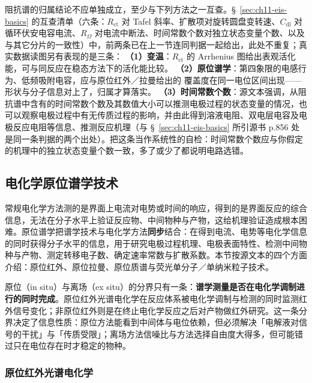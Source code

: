 \begin{crosscheck}
 阻抗谱的归属结论不应单独成立，至少与下列方法之一互查。§~\ref{sec:ch11-eis-basics} 的互查清单（六条：$R_{\mathrm{ct}}$ 对 Tafel 斜率、扩散项对旋转圆盘变转速、$C_{\mathrm{dl}}$ 对循环伏安电容电流、$R_{\Omega}$ 对电流中断法、时间常数个数对独立状态变量个数、以及与其它分片的一致性）中，前两条已在上一节连同判据一起给出，此处不重复；真实数据读图另有表现的是三条：
 \textbf{（1）变温}：$R_{\mathrm{ct}}$ 的 Arrhenius 图给出表观活化能，可与同反应在稳态方法下的活化能比较。
 \textbf{（2）原位谱学}：第四象限的电感行为、低频吸附电容，应与原位红外／拉曼给出的  覆盖度在同一电位区间出现——形状与分子信息对上了，归属才算落实。
 \textbf{（3）时间常数个数}：源文本强调，从阻抗谱中含有的时间常数个数及其数值大小可以推测电极过程的状态变量的情况，也可以观察电极过程中有无传质过程的影响，并由此得到溶液电阻、双电层电容及电极反应电阻等信息、推测反应机理（与 §~\ref{sec:ch11-eis-basics} 所引源书 p.856 处是同一条判据的两个出处）。把这条当作系统性的自检：时间常数个数应与你假定的机理中的独立状态变量个数一致，多了或少了都说明电路选错。
\end{crosscheck}

\subsection{电化学原位谱学技术}

常规电化学方法测的是界面上电流对电势或时间的响应，得到的是界面反应的综合信息，无法在分子水平上验证反应物、中间物种与产物，这给机理验证造成根本困难。原位谱学把谱学技术与电化学方法\textbf{同步}结合：在得到电流、电势等电化学信息的同时获得分子水平的信息，用于研究电极过程机理、电极表面特性、检测中间物种与产物、测定转移电子数、确定速率常数与扩散系数。本节按源文本的四个方面介绍：原位红外、原位拉曼、原位质谱与荧光单分子／单纳米粒子技术。

\begin{principle}
 原位（in situ）与离场（ex situ）的分界只有一条：\textbf{谱学测量是否在电化学调制进行的同时完成}。原位红外光谱电化学在反应体系被电化学调制与检测的同时监测红外信号变化；非原位红外则是在终止电化学反应之后对产物做红外研究。这一条分界决定了信息性质：原位方法能看到中间体与电位依赖，但必须解决「电解液对信号的干扰」与「传质受限」；离场方法信噪比与方法选择自由度大得多，但可能错过只在电位存在时才稳定的物种。
\end{principle}

\subsubsection{原位红外光谱电化学}


